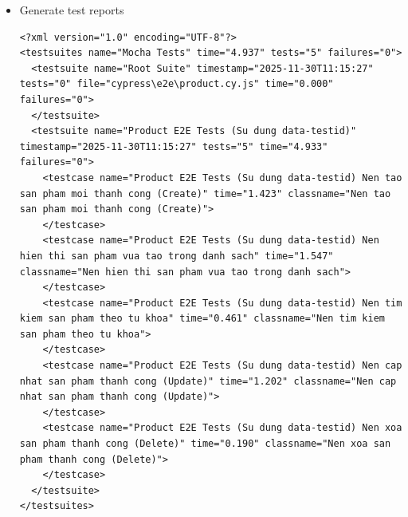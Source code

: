 \documentclass[a4paper,12pt]{article}
\begin{document}
{\begin{itemize}
\begin{tcolorbox}[breakable, colback=green!5,colframe=black!50,title=Tạo GitHub Actions Workflow ]
\begin{lstlisting}
      - name: Make Maven wrapper executable
        run: chmod +x ./backend/mvnw

      - name: Start Backend in Background (Port 8080)
        run: |
          cd backend
          ./mvnw spring-boot:run &
          sleep 20

      # --- Setup Node & Frontend ---
      - name: Setup Node.js
        uses: actions/setup-node@v2
        with:
          node-version: "18"

      - name: Install dependencies
        run: |
          cd frontend
          npm install

      - name: Start Frontend in Background (Port 5173)
        run: |
          cd frontend
          npm run build
          npm install -g serve
          serve -s dist -l 5173 &
          sleep 10

      # --- Run Product E2E Tests ---
      - name: Run Product E2E Tests
        run: |
          cd frontend
          npm run test:e2e:spec -- "cypress/e2e/product.cy.js"
        env:
          BASE_URL: http://localhost:5173

      # --- Upload Product Test Reports ---
      - name: Upload Product Test Reports
        # uses: actions/upload-artifact@v3
        uses: actions/upload-artifact@v4
        with:
          name: product-test-reports
          path: frontend/reports/

\end{lstlisting}
\end{tcolorbox}
    \item Generate test reports
\begin{tcolorbox}[breakable, colback=green!5,colframe=black!50,title=Generate test reports]
\begin{lstlisting}
<?xml version="1.0" encoding="UTF-8"?>
<testsuites name="Mocha Tests" time="4.937" tests="5" failures="0">
  <testsuite name="Root Suite" timestamp="2025-11-30T11:15:27" tests="0" file="cypress\e2e\product.cy.js" time="0.000" failures="0">
  </testsuite>
  <testsuite name="Product E2E Tests (Su dung data-testid)" timestamp="2025-11-30T11:15:27" tests="5" time="4.933" failures="0">
    <testcase name="Product E2E Tests (Su dung data-testid) Nen tao san pham moi thanh cong (Create)" time="1.423" classname="Nen tao san pham moi thanh cong (Create)">
    </testcase>
    <testcase name="Product E2E Tests (Su dung data-testid) Nen hien thi san pham vua tao trong danh sach" time="1.547" classname="Nen hien thi san pham vua tao trong danh sach">
    </testcase>
    <testcase name="Product E2E Tests (Su dung data-testid) Nen tim kiem san pham theo tu khoa" time="0.461" classname="Nen tim kiem san pham theo tu khoa">
    </testcase>
    <testcase name="Product E2E Tests (Su dung data-testid) Nen cap nhat san pham thanh cong (Update)" time="1.202" classname="Nen cap nhat san pham thanh cong (Update)">
    </testcase>
    <testcase name="Product E2E Tests (Su dung data-testid) Nen xoa san pham thanh cong (Delete)" time="0.190" classname="Nen xoa san pham thanh cong (Delete)">
    </testcase>
  </testsuite>
</testsuites>


\end{lstlisting}
\end{tcolorbox}
\end{itemize}}
\end{document}
